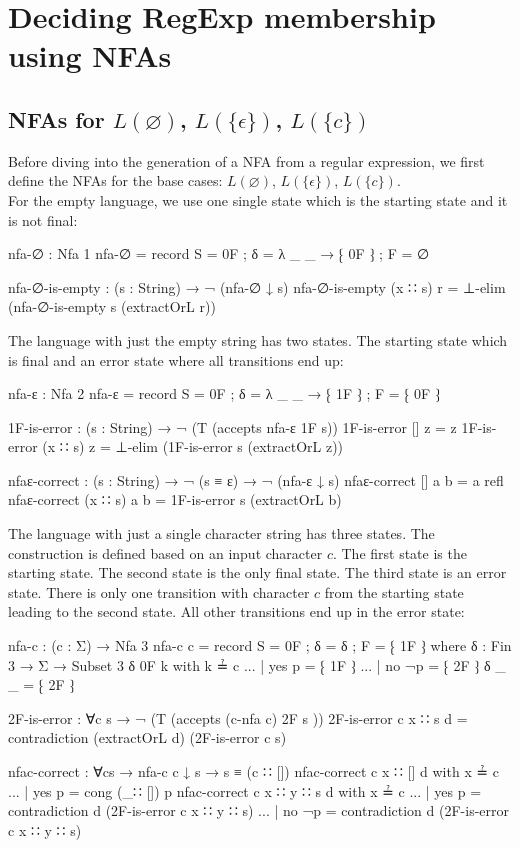 \section{Deciding RegExp membership using NFAs}
\subsection{NFAs for $L(\varnothing)$, $L(\{\epsilon\})$, $L(\{c\})$}
Before diving into the generation of a NFA from a regular expression, we first define the NFAs for the base cases: $L(\varnothing)$, $L(\{\epsilon\})$, $L(\{c\})$.\\
For the empty language, we use one single state which is the starting state and it is not final:
\begin{agda}
nfa-∅ : Nfa 1
nfa-∅ = record { S = 0F ; δ = λ _ _ → ⁅ 0F ⁆ ; F = ∅ }

nfa-∅-is-empty : (s : String) → ¬ (nfa-∅ ↓ s)
nfa-∅-is-empty (x ∷ s) r = ⊥-elim (nfa-∅-is-empty s (extractOrL r))
\end{agda}
The language with just the empty string has two states. The starting state which is final and an error state where all transitions end up:
\begin{agda}
nfa-ε : Nfa 2
nfa-ε = record { S = 0F ; δ = λ _ _ → ⁅ 1F ⁆ ; F = ⁅ 0F ⁆ }

1F-is-error : (s : String) → ¬ (T (accepts nfa-ε 1F s))
1F-is-error [] z = z
1F-is-error (x ∷ s) z = ⊥-elim (1F-is-error s (extractOrL z))

nfaε-correct : (s : String) → ¬ (s ≡ ε) → ¬ (nfa-ε ↓ s)
nfaε-correct [] a b = a refl
nfaε-correct (x ∷ s) a b = 1F-is-error s (extractOrL b)
\end{agda}
The language with just a single character string has three states. The construction is defined based on an input character $c$. The first state is the starting state. The second state is the only final state. The third state is an error state. There is only one transition with character $c$ from the starting state leading to the second state. All other transitions end up in the error state:
\begin{agda}
nfa-c : (c : Σ) → Nfa 3
nfa-c c = record { S = 0F ; δ = δ ; F = ⁅ 1F ⁆ }
  where
    δ : Fin 3 → Σ → Subset 3
    δ 0F k with k ≟ c
    ... | yes p = ⁅ 1F ⁆
    ... | no ¬p = ⁅ 2F ⁆
    δ _ _ = ⁅ 2F ⁆

2F-is-error : ∀{c s} → ¬ (T (accepts (c-nfa c) 2F s ))
2F-is-error {c} {x ∷ s} d =
  contradiction (extractOrL d) (2F-is-error {c} {s})

nfac-correct : ∀{c}{s} → nfa-c c ↓ s → s ≡ (c ∷ [])
nfac-correct {c} {x ∷ []} d with x ≟ c
... | yes p = cong (_∷ []) p
nfac-correct {c} {x ∷ y ∷ s} d with x ≟ c
... | yes p = contradiction d (2F-is-error {c} {x ∷ y ∷ s})
... | no ¬p = contradiction d (2F-is-error {c} {x ∷ y ∷ s})
\end{agda}

